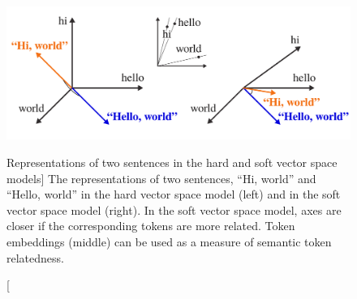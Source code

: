 \begin{figure}
\centering
\includegraphics{soft-vsm}
\vspace{-0.4cm}
\caption
  [Representations of two sentences in the hard and soft vector space models]%
  {The representations of two sentences, ``Hi, world'' and ``Hello,
   world'' in the hard vector space model (left) and in the soft vector space
   model (right). In the soft vector space model, axes are closer if the
   corresponding tokens are more related. Token embeddings (middle) can be used
   as a measure of semantic token relatedness. \cite[Figure
   6]{novotny2020three}}
\label{fig:soft-vsm}
\end{figure}
